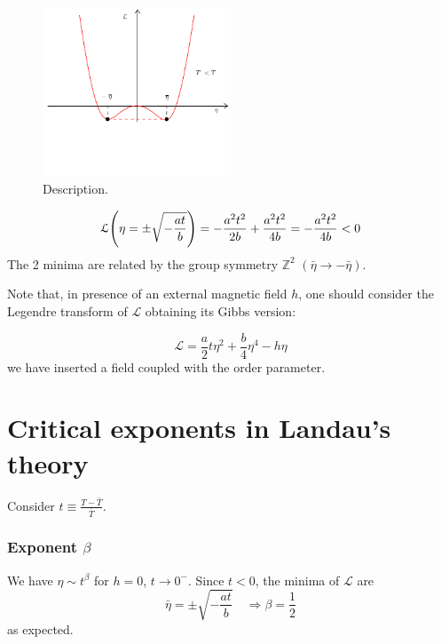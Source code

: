 \documentclass[../main/main.tex]{subfiles}
\begin{document}
\begin{itemize}
\begin{figure}[h!]
\centering
\includegraphics[width=0.5\textwidth]{../lessons/15_image/14.pdf}
\caption{\label{fig:15_11} Description.}
\end{figure}

\begin{equation}
  \mathcal{L} \qty(\eta = \pm \sqrt{- \frac{at}{b}} ) = - \frac{a^2 t^2}{2b} + \frac{a^2 t^2}{4b} = - \frac{a^2 t^2}{4b} < 0
\end{equation}
The 2 minima are related by the group symmetry \( \mathbb{Z}^2 \)  \( (\bar{\eta } \rightarrow - \bar{\eta }  ) \).
\end{itemize}

\begin{remark}
Note that, in presence of an external magnetic field \( h \), one should consider the Legendre transform of \( \mathcal{L} \) obtaining its Gibbs version:

\begin{equation}
  \mathcal{L} =  \frac{a}{2} t \eta ^2 + \frac{b}{4} \eta ^4 - h \eta
\end{equation}
we have inserted a field coupled with the order parameter.
\end{remark}

\section{Critical exponents in Landau's theory}
Consider \( t \equiv \frac{T- \bar{T} }{\bar{T} } \).

\subsubsection{Exponent \( \beta  \)}
We have  \( \eta \sim t^\beta  \) for \( h=0 \), \( t \rightarrow 0^- \). Since \( t<0 \), the minima of \( \mathcal{L} \) are
\begin{equation}
  \bar{\eta } = \pm \sqrt{- \frac{at}{b}} \quad \Rightarrow  \beta = \frac{1}{2}
\end{equation}
as expected.
\end{document}
